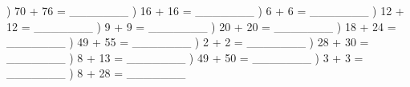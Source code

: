 \documentclass{article}%
\begin{document}
\newline%
) 70 + 76 = \_\_\_\_\_\_\_%
\newline%
\newline%
) 16 + 16 = \_\_\_\_\_\_\_%
\newline%
\newline%
) 6 + 6 = \_\_\_\_\_\_\_%
\newline%
\newline%
) 12 + 12 = \_\_\_\_\_\_\_%
\newline%
\newline%
) 9 + 9 = \_\_\_\_\_\_\_%
\newline%
\newline%
) 20 + 20 = \_\_\_\_\_\_\_%
\newline%
\newline%
) 18 + 24 = \_\_\_\_\_\_\_%
\newline%
\newline%
) 49 + 55 = \_\_\_\_\_\_\_%
\newline%
\newline%
) 2 + 2 = \_\_\_\_\_\_\_%
\newline%
\newline%
) 28 + 30 = \_\_\_\_\_\_\_%
\newline%
\newline%
) 8 + 13 = \_\_\_\_\_\_\_%
\newline%
\newline%
) 49 + 50 = \_\_\_\_\_\_\_%
\newline%
\newline%
) 3 + 3 = \_\_\_\_\_\_\_%
\newline%
\newline%
) 8 + 28 = \_\_\_\_\_\_\_%
\newline%
\newline%
\newline%
\end{document}
